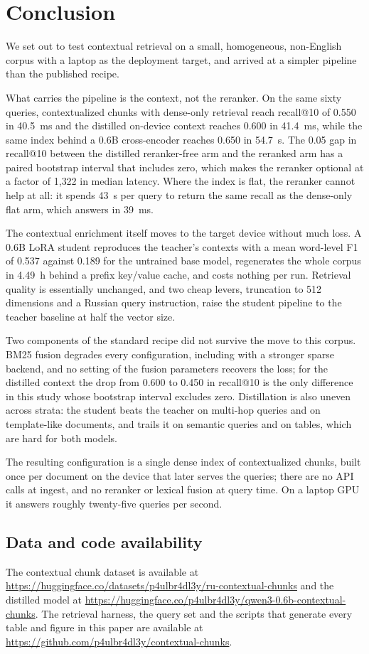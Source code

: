 \section{Conclusion}
\label{sec:conclusion}

We set out to test contextual retrieval on a small, homogeneous, non-English
corpus with a laptop as the deployment target, and arrived at a simpler pipeline
than the published recipe.

What carries the pipeline is the context, not the reranker. On the same sixty
queries, contextualized chunks with dense-only retrieval reach recall@10 of
0.550 in 40.5~ms and the distilled on-device context reaches 0.600 in 41.4~ms,
while the same index behind a 0.6B cross-encoder reaches 0.650 in 54.7~s. The
0.05 gap in recall@10 between the distilled reranker-free arm and the reranked
arm has a paired bootstrap interval that includes zero, which makes the reranker
optional at a factor of 1{,}322 in median latency. Where the index is flat, the
reranker cannot help at all: it spends 43~s per query to return the same recall
as the dense-only flat arm, which answers in 39~ms.

The contextual enrichment itself moves to the target device without much loss.
A 0.6B LoRA student reproduces the teacher's contexts with a mean word-level F1
of 0.537 against 0.189 for the untrained base model, regenerates the whole
corpus in 4.49~h behind a prefix key/value cache, and costs nothing per run.
Retrieval quality is essentially unchanged, and two cheap levers, truncation to
512 dimensions and a Russian query instruction, raise the student pipeline to
the teacher baseline at half the vector size.

Two components of the standard recipe did not survive the move to this corpus.
BM25 fusion degrades every configuration, including with a stronger sparse
backend, and no setting of the fusion parameters recovers the loss; for the
distilled context the drop from 0.600 to 0.450 in recall@10 is the only
difference in this study whose bootstrap interval excludes zero. Distillation is
also uneven across strata: the student beats the teacher on multi-hop queries
and on template-like documents, and trails it on semantic queries and on tables,
which are hard for both models.

The resulting configuration is a single dense index of contextualized chunks,
built once per document on the device that later serves the queries; there are
no API calls at ingest, and no reranker or lexical fusion at query time. On a
laptop GPU it answers roughly twenty-five queries per second.

\subsection{Data and code availability}
\label{sec:availability}

The contextual chunk dataset is available at
\url{https://huggingface.co/datasets/p4ulbr4dl3y/ru-contextual-chunks} and
the distilled model at
\url{https://huggingface.co/p4ulbr4dl3y/qwen3-0.6b-contextual-chunks}. The
retrieval harness, the query set and the scripts that generate every table and
figure in this paper are available at
\url{https://github.com/p4ulbr4dl3y/contextual-chunks}.
